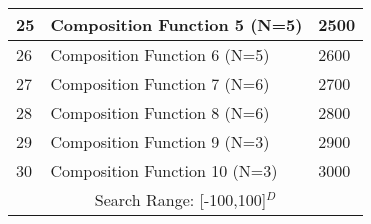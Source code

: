 \begin{table}[!htbp]
\begin{tabular}{|p{0.5cm}|p{5.4cm}|p{0.6cm}|}
25 & Composition Function 5 (N=5) & 2500\\
\hline
26 & Composition Function 6 (N=5) & 2600\\
\hline
27 & Composition Function 7 (N=6) & 2700\\
\hline
28 & Composition Function 8 (N=6) & 2800 \\
\hline
29 & Composition Function 9 (N=3) & 2900 \\
\hline
30 & Composition Function 10 (N=3) & 3000 \\
\hline
\multicolumn{3}{|c|}{Search Range: [-100,100]$^{D}$ }  \\
\hline
\end{tabular}
\vspace{-5mm}
\end{table}

